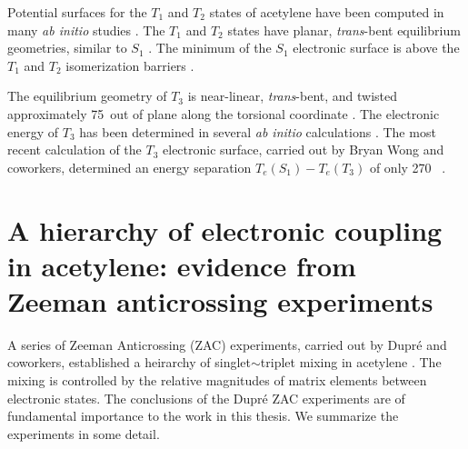 Potential surfaces for the $T_1$ and $T_2$ states of acetylene have
been computed in many \emph{ab initio} studies \cite{demoulin75,
  wetmore78, lischka86, yamaguchi93, cui96, cui97, malsch98, dallos02,
  ventura03}.  The $T_1$ and $T_2$ states have planar,
\emph{trans}-bent equilibrium geometries, similar to $S_1$
\cite{demoulin75, wetmore78, yamaguchi93}.  The minimum of the $S_1$
electronic surface is above the $T_1$ and $T_2$ isomerization barriers
\cite{vacek96, sherrill96}.

The equilibrium geometry of $T_3$ is near-linear, \emph{trans}-bent,
and twisted approximately 75\degrees\ out of plane along the torsional
coordinate \cite{ventura03, thom07}.  The electronic energy of $T_3$
has been determined in several \emph{ab initio} calculations
\cite{malsch98, ventura03, thom07}.
The most recent calculation of the $T_3$ electronic surface, carried
out by Bryan Wong and coworkers, determined an energy separation
$T_e(S_1)-T_e(T_3)$ of only 270 \rcm\ \cite{thom07}.






\section{A hierarchy of electronic coupling in acetylene: evidence from
  Zeeman anticrossing experiments}

A series of Zeeman Anticrossing (ZAC) experiments, carried out by
Dupr\'{e} and coworkers, established a heirarchy of
singlet$\sim$triplet mixing in acetylene \cite{dupre91, dupre93,
  dupre95a, dupre95b}.  The mixing is controlled by the relative
magnitudes of matrix elements between electronic states.  The
conclusions of the Dupr\'{e} ZAC experiments are of fundamental
importance to the work in this thesis.  We summarize the experiments
in some detail.

